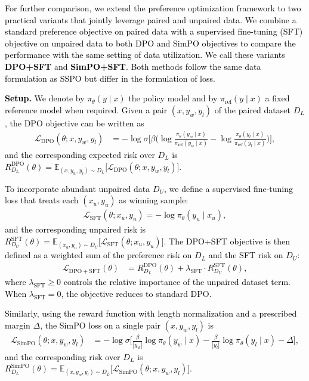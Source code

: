 \documentclass{article} %
\newcommand\rebuttal[1]{\textcolor{black}{#1}}
\begin{document}
\rebuttal{For further comparison, we extend the preference optimization framework to two practical variants that jointly leverage paired and unpaired data. We combine a standard preference objective on paired data with a supervised fine-tuning (SFT) objective on unpaired data to both DPO and SimPO objectives to compare the performance with the same setting of data utilization. We call these variants \textbf{DPO+SFT} and \textbf{SimPO+SFT}. Both methods follow the same data formulation as SSPO but differ in the formulation of loss.}

\noindent \rebuttal{\textbf{Setup.} We denote by $\pi_\theta(y \mid x)$ the policy model and by $\pi_{\mathrm{ref}}(y \mid x)$ a fixed reference model when required. Given a pair $(x,y_w,y_l)$ of the paired dataset $D_L$, the DPO objective can be written as
\begin{align}
    \mathcal{L}_{\mathrm{DPO}}(\theta; x,y_w,y_l)
    &= - \log \sigma\!\Big[ \beta \big( \log\frac{\pi_\theta(y_w \mid x)}{\pi_\mathrm{ref}(y_w \mid x)} - \log\frac{\pi_\theta(y_l \mid x)}{\pi_\mathrm{ref}(y_l \mid x)}\big) \Big], \nonumber
\end{align}
and the corresponding expected risk over $D_L$ is $R_{D_L}^{\mathrm{DPO}}(\theta) = \mathbb{E}_{(x,y_w,y_l) \sim D_L} \big[ \mathcal{L}_{\mathrm{DPO}}(\theta; x,y_w,y_l) \big]$.}

\rebuttal{To incorporate abundant unpaired data $D_U$, we define a supervised fine-tuning loss that treats each $(x_u,y_u)$ as winning sample:
\begin{align}
    \mathcal{L}_{\mathrm{SFT}}(\theta; x_u,y_u)
    = - \log \pi_\theta(y_u \mid x_u), \nonumber
\end{align}
and the corresponding unpaired risk is $R_{D_U}^{\mathrm{SFT}}(\theta) = \mathbb{E}_{(x_u,y_u) \sim D_U} \big[ \mathcal{L}_{\mathrm{SFT}}(\theta; x_u,y_u) \big]$. The DPO+SFT objective is then defined as a weighted sum of the preference risk on $D_L$ and the SFT risk on $D_U$:
\begin{align}
    \mathcal{L}_{\mathrm{DPO+SFT}}(\theta)
    &= R_{D_L}^{\mathrm{DPO}}(\theta)
    + \lambda_{\mathrm{SFT}} \cdot R_{D_U}^{\mathrm{SFT}}(\theta), \nonumber
\end{align}
where $\lambda_{\mathrm{SFT}} \ge 0$ controls the relative importance of the unpaired dataset term. When $\lambda_{\mathrm{SFT}} = 0$, the objective reduces to standard DPO.}


\rebuttal{Similarly, using the reward function with length normalization and a prescribed margin $\Delta$, the SimPO loss on a single pair $(x,y_w,y_l)$ is
\begin{align}
    \mathcal{L}_{\mathrm{SimPO}}(\theta; x,y_w,y_l)
    &= - \log \sigma\Bigg[
        \frac{\beta}{|y_w|} \log \pi_\theta(y_w \mid x)
        - \frac{\beta}{|y_l|} \log \pi_\theta(y_l \mid x)
        - \Delta \nonumber
    \Bigg],
\end{align}
and the corresponding risk over $D_L$ is $R_{D_L}^{\mathrm{SimPO}}(\theta) = \mathbb{E}_{(x,y_w,y_l) \sim D_L} \big[ \mathcal{L}_{\mathrm{SimPO}}(\theta; x,y_w,y_l) \big]$. }
\end{document}
